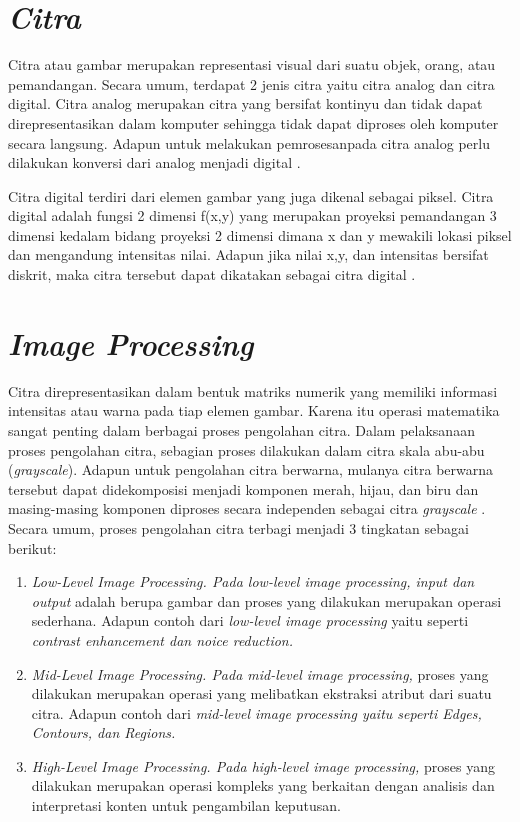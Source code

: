 \section{\textit{Citra}}
\label{sec:citra}

Citra atau gambar merupakan representasi visual dari suatu objek, orang, atau pemandangan. Secara umum, terdapat 2 jenis citra yaitu citra analog dan citra digital. Citra analog merupakan citra yang bersifat kontinyu dan tidak dapat direpresentasikan dalam komputer sehingga tidak dapat diproses oleh komputer secara langsung. Adapun untuk melakukan pemrosesanpada citra analog perlu dilakukan konversi dari analog menjadi digital \citep*{tyagi2018understanding}. \par

Citra digital terdiri dari elemen gambar yang juga dikenal sebagai piksel. Citra digital adalah fungsi 2 dimensi f(x,y) yang merupakan proyeksi pemandangan 3 dimensi kedalam bidang proyeksi 2 dimensi dimana x dan y mewakili lokasi piksel dan mengandung intensitas nilai. Adapun jika nilai x,y, dan intensitas bersifat diskrit, maka citra tersebut dapat dikatakan sebagai citra digital \citep*{tyagi2018understanding}. \par

\section{\textit{Image Processing}}
\label{sec:imageprocessing}
Citra direpresentasikan dalam bentuk matriks numerik yang memiliki informasi intensitas atau warna pada tiap elemen gambar. Karena itu operasi matematika sangat penting dalam berbagai proses pengolahan citra. Dalam pelaksanaan proses pengolahan citra, sebagian proses dilakukan dalam citra skala abu-abu (\textit{grayscale}). Adapun untuk pengolahan citra berwarna, mulanya citra berwarna tersebut dapat didekomposisi menjadi komponen merah, hijau, dan biru dan masing-masing komponen diproses secara independen sebagai citra \textit{grayscale} \citep*{tyagi2018understanding}. Secara umum, proses pengolahan citra terbagi menjadi 3 tingkatan sebagai berikut:
\begin{enumerate}[nolistsep]
    \item \textit{Low-Level Image Processing. \textnormal{Pada} low-level image processing, input \textnormal{dan} output} adalah berupa gambar dan proses yang dilakukan merupakan operasi sederhana. Adapun contoh dari \textit{low-level image processing} yaitu seperti \textit{contrast enhancement \textnormal{dan} noice reduction.}  
    \item \textit{Mid-Level Image Processing. \textnormal{Pada} mid-level image processing,} proses yang dilakukan merupakan operasi yang melibatkan ekstraksi atribut dari suatu citra. Adapun contoh dari \textit{mid-level image processing \textnormal{yaitu seperti} Edges, Contours, \textnormal{dan} Regions.}
    \item \textit{High-Level Image Processing. \textnormal{Pada} high-level image processing,} proses yang dilakukan merupakan operasi kompleks yang berkaitan dengan analisis dan interpretasi konten untuk pengambilan keputusan.
\end{enumerate} 

